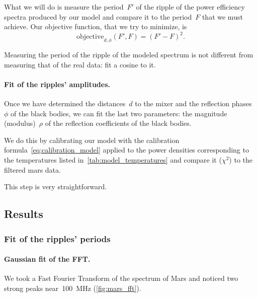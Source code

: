 What we will do is measure the period~$F'$ of the ripple of the power efficiency spectra produced by our model and compare it to the period~$F$ that we must achieve.
Our objective function, that we try to minimize, is
\begin{equation}
    \text{objective}_{d, \phi}(F', F) = (F' - F)^2\text{.}
\end{equation}

Measuring the period of the ripple of the modeled spectrum is not different from measuring that of the real data: fit a cosine to it.


\paragraph{Fit of the ripples' amplitudes.}
Once we have determined the distances~$d$ to the mixer and the reflection phases~$\phi$ of the black bodies, we can fit the last two parameters:
the magnitude (modulus)~$\rho$ of the reflection coefficients of the black bodies.

We do this by calibrating our model with the calibration formula~\cref{eq:calibration_model} applied to the power densities corresponding to the temperatures listed in~\cref{tab:model_temperatures}
and compare it ($\chi^2$) to the filtered mars data.

This step is very straightforward.



\subsection{Results}

\subsubsection{Fit of the ripples' periods}

\paragraph{Gaussian fit of the FFT.}
We took a Fast Fourier Transform of the spectrum of Mars and noticed two strong peaks near~\SI{100}{\mega\hertz} (\cref{fig:mars_fft}).

